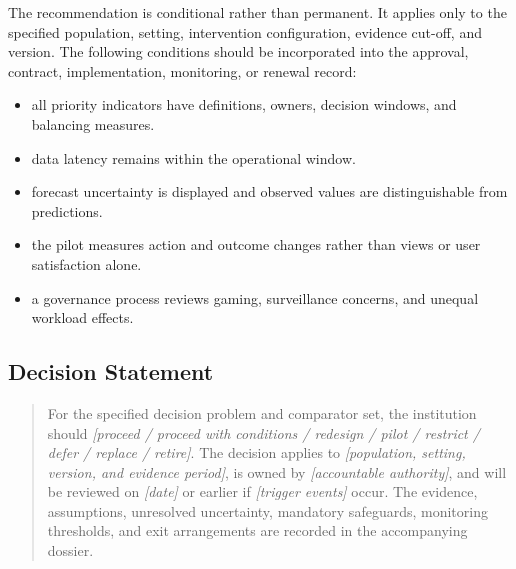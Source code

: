 The recommendation is conditional rather than permanent. It applies only to the
specified population, setting, intervention configuration, evidence cut-off, and
version. The following conditions should be incorporated into the approval,
contract, implementation, monitoring, or renewal record:

\begin{itemize}
 \item all priority indicators have definitions, owners, decision windows, and balancing measures.
 \item data latency remains within the operational window.
 \item forecast uncertainty is displayed and observed values are distinguishable from predictions.
 \item the pilot measures action and outcome changes rather than views or user satisfaction alone.
 \item a governance process reviews gaming, surveillance concerns, and unequal workload effects.
\end{itemize}

\subsection{Decision Statement}
\begin{quote}
For the specified decision problem and comparator set, the institution should
\emph{[proceed / proceed with conditions / redesign / pilot / restrict / defer /
replace / retire]}. The decision applies to \emph{[population, setting, version,
and evidence period]}, is owned by \emph{[accountable authority]}, and will be
reviewed on \emph{[date]} or earlier if \emph{[trigger events]} occur. The
evidence, assumptions, unresolved uncertainty, mandatory safeguards, monitoring
thresholds, and exit arrangements are recorded in the accompanying dossier.
\end{quote}
